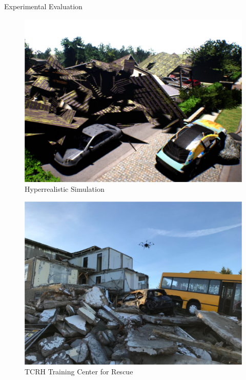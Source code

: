 \documentclass[10pt]{beamer}
\begin{document}
    \begin{frame}{Experimental Evaluation}
        \begin{figure}%
            \begin{minipage}{0.45\linewidth}
                \centering
                \includegraphics[width=\textwidth]{images/Fig5a.png}
                {\scriptsize Hyperrealistic Simulation}
            \end{minipage}
            \hspace{0.25cm}
            \begin{minipage}{0.45\linewidth}
                \centering
                \includegraphics[width=\textwidth]{images/Fig5b.png}
                {\scriptsize TCRH Training Center for Rescue}
            \end{minipage}
        \end{figure}
    \end{frame}
\end{document}
